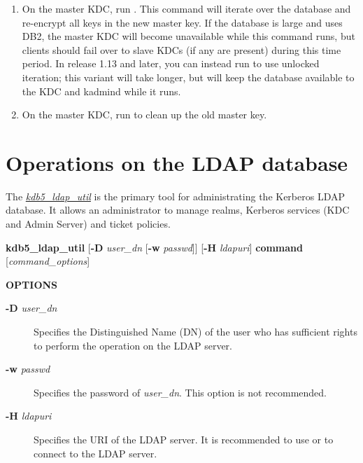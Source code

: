 \documentclass[letterpaper,10pt,english]{sphinxmanual}
\begin{document}
\begin{enumerate}
\item {} 
On the master KDC, run .  This
command will iterate over the database and re-encrypt all keys in
the new master key.  If the database is large and uses DB2, the
master KDC will become unavailable while this command runs, but
clients should fail over to slave KDCs (if any are present) during
this time period.  In release 1.13 and later, you can instead run
 to use unlocked
iteration; this variant will take longer, but will keep the
database available to the KDC and kadmind while it runs.

\item {} 
On the master KDC, run  to clean up the
old master key.

\end{enumerate}


\section{Operations on the LDAP database}
\label{admin/database:operations-on-the-ldap-database}\label{admin/database:ops-on-ldap}
The {\hyperref[admin/admin_commands/kdb5_ldap_util:kdb5-ldap-util-8]{\emph{kdb5\_ldap\_util}}} is the primary tool for administrating
the Kerberos LDAP database.  It allows an administrator to manage
realms, Kerberos services (KDC and Admin Server) and ticket policies.

\textbf{kdb5\_ldap\_util}
{[}\textbf{-D} \emph{user\_dn} {[}\textbf{-w} \emph{passwd}{]}{]}
{[}\textbf{-H} \emph{ldapuri}{]}
\textbf{command}
{[}\emph{command\_options}{]}

\textbf{OPTIONS}
\begin{description}
\item[{\textbf{-D} \emph{user\_dn}}] \leavevmode
Specifies the Distinguished Name (DN) of the user who has
sufficient rights to perform the operation on the LDAP server.

\item[{\textbf{-w} \emph{passwd}}] \leavevmode
Specifies the password of \emph{user\_dn}.  This option is not
recommended.

\item[{\textbf{-H} \emph{ldapuri}}] \leavevmode
Specifies the URI of the LDAP server.  It is recommended to use
 or  to connect to the LDAP server.

\end{description}
\end{document}

